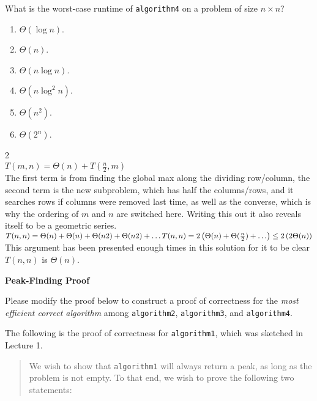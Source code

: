 \documentclass[12pt,twoside]{article}
\begin{document}
\begin{problems}
\begin{problemparts}
\problempart {} What is the worst-case runtime of \texttt{algorithm4} on a problem of size $n \times n$?
\begin{enumerate}
\item $\Theta(\log n)$.
\item $\Theta(n)$.
\item $\Theta(n \log n)$.
\item $\Theta(n \log^2 n)$.
\item $\Theta(n^2)$.
\item $\Theta(2^n)$.
\end{enumerate}

\ifsolution \solution{}
2
\\$T(m,n) = \Theta(n) + T(\frac{n}{2},m)$
\\The first term is from finding the global max along the dividing row/column, the second term is the new subproblem, which has half the columns/rows, and it searches rows if columns were removed last time, as well as the converse, which is why the ordering of $m$ and $n$ are switched here.  Writing this out it also reveals itself to be a geometric series.
\\$T(n,n) = \Theta(n) + \Theta(n) + \Theta({n}{2}) + \Theta({n}{2}) + \ldots
\\T(n,n) = 2\left( \Theta(n) + \Theta(\frac{n}{2}) + \ldots \right) \leq 2\left(2\Theta(n)\right)$
This argument has been presented enough times in this solution for it to be clear $T(n,n)$ is $\Theta(n)$.
\fi

\end{problemparts}

\problem {} \textbf{Peak-Finding Proof}

Please modify the proof below to construct a proof of correctness
for the \emph{most efficient correct algorithm}
among \texttt{algorithm2}, \texttt{algorithm3}, and \texttt{algorithm4}.

The following is the proof of correctness
for \texttt{algorithm1},
which was sketched in Lecture 1.

\begin{quote}
We wish to show that \texttt{algorithm1}
will always return a peak,
as long as the problem is not empty.
To that end,
we wish to prove the following two statements:


\end{quote}
\end{problems}
\end{document}
